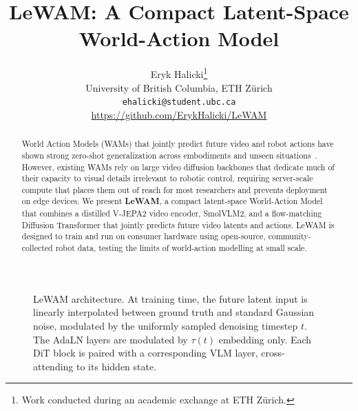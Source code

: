 \documentclass{article}
\title{LeWAM: A Compact Latent-Space World-Action Model}
\author{
    Eryk Halicki\thanks{Work conducted during an academic exchange at ETH Z\"urich.}\\
    University of British Columbia, ETH Z\"urich\\
    \texttt{ehalicki@student.ubc.ca}\\
    \url{https://github.com/ErykHalicki/LeWAM}
}
\begin{document}
\maketitle

\begin{abstract}
      World Action Models (WAMs) that jointly predict future video and robot actions have shown strong zero-shot generalization across embodiments and unseen situations~\cite{DreamZero, MimicVideo, UWM}. 
    However, existing WAMs rely on large video diffusion backbones that dedicate much of their capacity to visual details irrelevant to robotic control, requiring server-scale compute that places them out of reach for most researchers and prevents deployment on edge devices.
      We present \textbf{LeWAM}, a compact latent-space World-Action Model that combines a distilled V-JEPA2 video encoder, SmolVLM2, and a flow-matching Diffusion Transformer that jointly predicts future video latents and actions.
      LeWAM is designed to train and run on consumer hardware using open-source, community-collected robot data, testing the limits of world-action modelling at small scale.
  \end{abstract}

\begin{figure}[h]
    \centering
    \resizebox{\textwidth}{!}{}
    \caption{LeWAM architecture. At training time, the future latent input is linearly interpolated between ground truth and standard Gaussian noise, modulated by the uniformly sampled denoising timestep $t$. The AdaLN layers are modulated by $\tau(t)$ embedding only. Each DiT block is paired with a corresponding VLM layer, cross-attending to its hidden state.}
    \label{fig:arch}
\end{figure}










\end{document}
